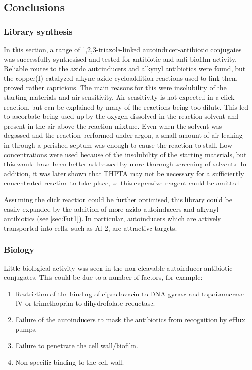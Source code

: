 \subsection{Conclusions}

\subsubsection{Library synthesis}

In this section, a range of 1,2,3-triazole-linked autoinducer-antibiotic conjugates was successfully synthesised and tested for antibiotic and anti-biofilm activity.
Reliable routes to the azido autoinducers and alkynyl antibiotics were found, but the copper(I)-catalyzed alkyne-azide cycloaddition reactions used to link them proved rather capricious.
The main reasons for this were insolubility of the starting materials and air-sensitivity. 
Air-sensitivity is not expected in a click reaction, but can be explained by many of the reactions being too dilute\cite{Hong2009}. 
This led to ascorbate being used up by the oxygen dissolved in the reaction solvent and present in the air above the reaction mixture. 
Even when the solvent was degassed and the reaction performed under argon, a small amount of air leaking in through a perished septum was enough to cause the reaction to stall.
Low concentrations were used because of the insolubility of the starting materials, but this would have been better addressed by more thorough screening of solvents.
In addition, it was later shown that THPTA may not be necessary for a sufficiently concentrated reaction to take place\cite{Stokes2017}, so this expensive reagent could be omitted.

Assuming the click reaction could be further optimised, this library could be easily expanded by the addition of more azido autoinducers and alkynyl antibiotics (see \ref{sec:Fut1}). In particular, autoinducers which are actively transported into cells, such as AI-2, are attractive targets.

\subsubsection{Biology}

Little biological activity was seen in the non-cleavable autoinducer-antibiotic conjugates. This could be due to a number of factors, for example:

\begin{enumerate}
\item Restriction of the binding of ciprofloxacin to DNA gyrase and topoisomerase IV\cite{Drlica1997} or trimethoprim to dihydrofolate reductase\cite{Brogden1982}.

\item Failure of the autoinducers to mask the antibiotics from recognition by efflux pumps.

\item Failure to penetrate the cell wall/biofilm.

\item Non-specific binding to the cell wall.
\end{enumerate}

